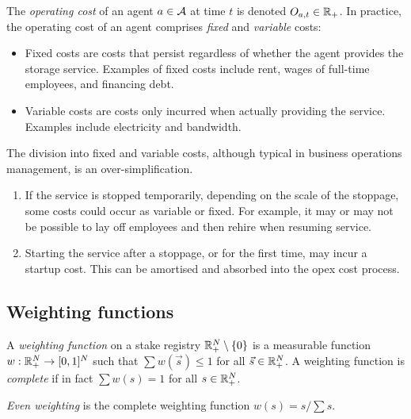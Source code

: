The \emph{operating cost} of an agent $a\in\mathcal{A}$ at time $t$ is denoted $O_{a,t}\in\mathbb{R}_+$.
%
In practice, the operating cost of an agent comprises \emph{fixed} and \emph{variable} costs:
\begin{itemize}
  \item 
    Fixed costs are costs that persist regardless of whether the agent provides the storage service.
    Examples of fixed costs include rent, wages of full-time employees, and financing debt.

  \item
    Variable costs are costs only incurred when actually providing the service.
    Examples include electricity and bandwidth.
\end{itemize}

The division into fixed and variable costs, although typical in business operations management, is an over-simplification.
%
\begin{enumerate}
  \item 
    If the service is stopped temporarily, depending on the scale of the stoppage, some costs could occur as variable or fixed.
    For example, it may or may not be possible to lay off employees and then rehire when resuming service.

  \item
    Starting the service after a stoppage, or for the first time, may incur a startup cost.
    This can be amortised and absorbed into the opex cost process.
\end{enumerate}

\subsection{Weighting functions}

\begin{definition}

  A \emph{weighting function} on a stake registry $\mathbb{R}_+^N\setminus\{0\}$ is a measurable function $w:\mathbb{R}_+^N\rightarrow[0,1]^N$ such that $\sum w(\vec{s}) \leq 1$ for all $\vec{s}\in \mathbb{R}_+^N$.
  A weighting function is \emph{complete} if in fact $\sum w(s) = 1$ for all $s\in \mathbb{R}_+^N$.

\end{definition}

\begin{example}
  \emph{Even weighting} is the complete weighting function $w(s) = s/\sum s$.
\end{example}


